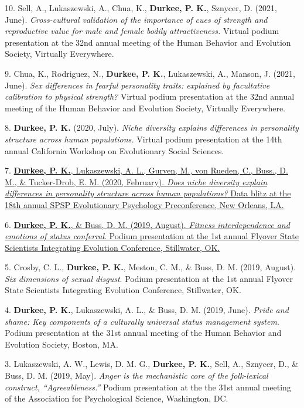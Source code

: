 \documentclass[10pt,]{article}
\begin{document}
10. \hangindent=0.5in Sell, A., Lukaszewski, A., Chua, K.,
\textbf{Durkee, P. K.}, Sznycer, D. (2021, June). \emph{Cross-cultural
validation of the importance of cues of strength and reproductive value
for male and female bodily attractiveness.} Virtual podium presentation
at the 32nd annual meeting of the Human Behavior and Evolution Society,
Virtually Everywhere.

9. \hangindent=0.5in Chua, K., Rodriguez, N., \textbf{Durkee, P. K.},
Lukaszewski, A., Manson, J. (2021, June). \emph{Sex differences in
fearful personality traits: explained by facultative calibration to
physical strength?} Virtual podium presentation at the 32nd annual
meeting of the Human Behavior and Evolution Society, Virtually
Everywhere.

8. \hangindent=0.5in \textbf{Durkee, P. K.} (2020, July). \emph{Niche
diversity explains differences in personality structure across human
populations.} Virtual podium presentation at the 14th annual California
Workshop on Evolutionary Social Sciences.

7. \hangindent=0.5in \href{https://osf.io/6gp85/}{\textbf{Durkee, P.
K.}, Lukaszewski, A. L., Gurven, M., von Rueden, C., Buss., D. M., \&
Tucker-Drob, E. M. (2020, February). \emph{Does niche diversity explain
differences in personality structure across human populations?} Data
blitz at the 18th annual SPSP Evolutionary Psychology Preconference, New
Orleans, LA.\textsuperscript{\faFilePdfO}}

6. \hangindent=0.5in \href{https://osf.io/6enb8/}{\textbf{Durkee, P.
K.}, \& Buss, D. M. (2019, August). \emph{Fitness interdependence and
emotions of status conferral}. Podium presentation at the 1st annual
Flyover State Scientists Integrating Evolution Conference, Stillwater,
OK.\textsuperscript{\faFilePdfO}}

5. \hangindent=0.5in Crosby, C. L., \textbf{Durkee, P. K.}, Meston, C.
M., \& Buss, D. M. (2019, August). \emph{Six dimensions of sexual
disgust}. Podium presentation at the 1st annual Flyover State Scientists
Integrating Evolution Conference, Stillwater, OK.

4. \hangindent=0.5in \textbf{Durkee, P. K.}, Lukaszewski, A. L., \&
Buss, D. M. (2019, June). \emph{Pride and shame: Key components of a
culturally universal status management system}. Podium presentation at
the 31st annual meeting of the Human Behavior and Evolution Society,
Boston, MA.

3. \hangindent=0.5in Lukaszewski, A. W., Lewis, D. M. G.,
\textbf{Durkee, P. K.}, Sell, A., Sznycer, D., \& Buss, D. M. (2019,
May). \emph{Anger is the mechanistic core of the folk-lexical construct,
``Agreeableness.''} Podium presentation at the the 31st annual meeting
of the Association for Psychological Science, Washington, DC.
\end{document}
